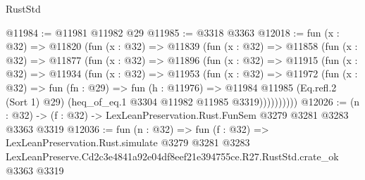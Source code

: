 \begin{lexlean}{RustStd}
\begin{coremodule}
@11984 := @11981 @11982 @29
@11985 := @3318 @3363
@12018 := fun (x : @32) =>
  @11820
    (fun (x : @32) =>
    @11839
      (fun (x : @32) =>
      @11858
        (fun (x : @32) =>
        @11877
          (fun (x : @32) =>
          @11896
            (fun (x : @32) =>
            @11915
              (fun (x : @32) =>
              @11934
                (fun (x : @32) =>
                @11953
                  (fun (x : @32) =>
                  @11972
                    (fun (x : @32) =>
                    fun (fn : @29) =>
                    fun (h : @11976) =>
                    @11984
                      @11985
                      (Eq.refl.{2} (Sort 1) @29)
                      (heq_of_eq.{1} @3304 @11982 @11985 @3319))))))))))
@12026 := (n : @32) -> (f : @32) -> LexLeanPreservation.Rust.FunSem @3279 @3281 @3283 @3363 @3319
@12036 := fun (n : @32) =>
  fun (f : @32) =>
  LexLeanPreservation.Rust.simulate
    @3279
    @3281
    @3283
    LexLeanPreserve.Cd2c3e4841a92e04df8eef21e394755ce.R27.RustStd.crate_ok
    @3363
    @3319
\end{coremodule}
\end{lexlean}
